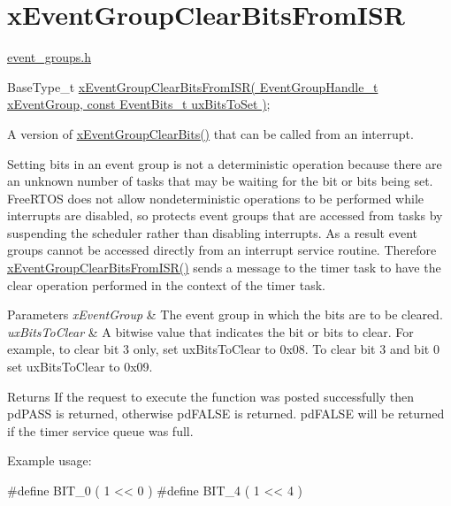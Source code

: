 \hypertarget{group__xEventGroupClearBitsFromISR}{\section{x\-Event\-Group\-Clear\-Bits\-From\-I\-S\-R}
\label{group__xEventGroupClearBitsFromISR}
}
\hyperlink{event__groups_8h}{event\-\_\-groups.\-h} 
\begin{DoxyPre}
    BaseType\_t \hyperlink{event__groups_8h_a3d7de214a697f33fe7b914e26a93f33a}{xEventGroupClearBitsFromISR( EventGroupHandle\_t xEventGroup, const EventBits\_t uxBitsToSet )};
 \end{DoxyPre}


A version of \hyperlink{event__groups_8h_a0fb72cfdd4f0d5f86d955fc3af448f2a}{x\-Event\-Group\-Clear\-Bits()} that can be called from an interrupt.

Setting bits in an event group is not a deterministic operation because there are an unknown number of tasks that may be waiting for the bit or bits being set. Free\-R\-T\-O\-S does not allow nondeterministic operations to be performed while interrupts are disabled, so protects event groups that are accessed from tasks by suspending the scheduler rather than disabling interrupts. As a result event groups cannot be accessed directly from an interrupt service routine. Therefore \hyperlink{event__groups_8h_a3d7de214a697f33fe7b914e26a93f33a}{x\-Event\-Group\-Clear\-Bits\-From\-I\-S\-R()} sends a message to the timer task to have the clear operation performed in the context of the timer task.


\begin{DoxyParams}{Parameters}
{\em x\-Event\-Group} & The event group in which the bits are to be cleared.\\
\hline
{\em ux\-Bits\-To\-Clear} & A bitwise value that indicates the bit or bits to clear. For example, to clear bit 3 only, set ux\-Bits\-To\-Clear to 0x08. To clear bit 3 and bit 0 set ux\-Bits\-To\-Clear to 0x09.\\
\hline
\end{DoxyParams}
\begin{DoxyReturn}{Returns}
If the request to execute the function was posted successfully then pd\-P\-A\-S\-S is returned, otherwise pd\-F\-A\-L\-S\-E is returned. pd\-F\-A\-L\-S\-E will be returned if the timer service queue was full.
\end{DoxyReturn}
Example usage\-: 
\begin{DoxyPre}
   #define BIT\_0    ( 1 << 0 )
   #define BIT\_4    ( 1 << 4 )\end{DoxyPre}



